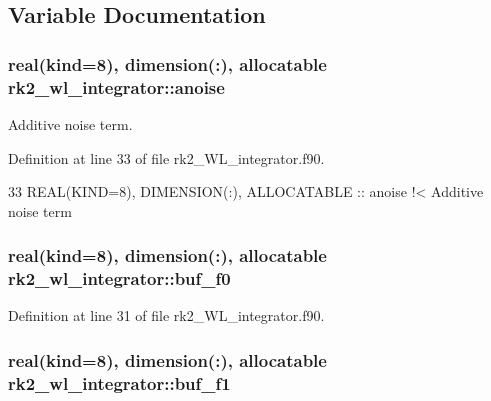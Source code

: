 \subsection{Variable Documentation}
\subsubsection[{\texorpdfstring{anoise}{anoise}}]{\setlength{\rightskip}{0pt plus 5cm}real(kind=8), dimension(\+:), allocatable rk2\+\_\+wl\+\_\+integrator\+::anoise\hspace{0.3cm}{\ttfamily [private]}}\hypertarget{namespacerk2__wl__integrator_ab0045343086f8e55d6dd0579105aad6d}{}\label{namespacerk2__wl__integrator_ab0045343086f8e55d6dd0579105aad6d}


Additive noise term. 



Definition at line 33 of file rk2\+\_\+\+W\+L\+\_\+integrator.\+f90.


\begin{DoxyCode}
33   \textcolor{keywordtype}{REAL(KIND=8)}, \textcolor{keywordtype}{DIMENSION(:)}, \textcolor{keywordtype}{ALLOCATABLE} :: anoise\textcolor{comment}{          !< Additive noise term}
\end{DoxyCode}
\subsubsection[{\texorpdfstring{buf\+\_\+f0}{buf_f0}}]{\setlength{\rightskip}{0pt plus 5cm}real(kind=8), dimension(\+:), allocatable rk2\+\_\+wl\+\_\+integrator\+::buf\+\_\+f0\hspace{0.3cm}{\ttfamily [private]}}\hypertarget{namespacerk2__wl__integrator_a1bd3729b5251a62db77c2821d8570527}{}\label{namespacerk2__wl__integrator_a1bd3729b5251a62db77c2821d8570527}


Definition at line 31 of file rk2\+\_\+\+W\+L\+\_\+integrator.\+f90.

\subsubsection[{\texorpdfstring{buf\+\_\+f1}{buf_f1}}]{\setlength{\rightskip}{0pt plus 5cm}real(kind=8), dimension(\+:), allocatable rk2\+\_\+wl\+\_\+integrator\+::buf\+\_\+f1\hspace{0.3cm}{\ttfamily [private]}}\hypertarget{namespacerk2__wl__integrator_a995936e8fb15609c95896f08b5e70a44}{}\label{namespacerk2__wl__integrator_a995936e8fb15609c95896f08b5e70a44}


